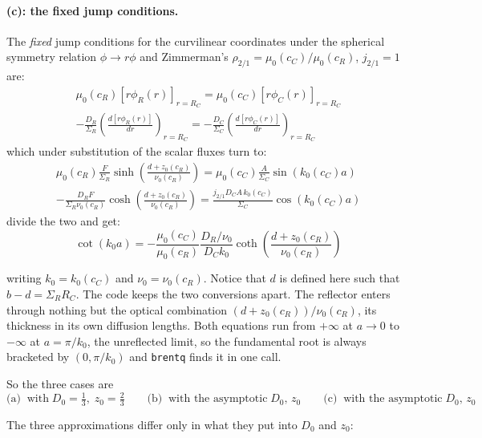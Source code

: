 \documentclass[11pt]{article}
\begin{document}
\paragraph{(c): the fixed jump conditions.} The \textit{fixed} jump conditions for the curvilinear coordinates under the spherical symmetry relation $\phi \to r\phi$ and Zimmerman's $\rho_{2/1} = \mu_0(c_C)/\mu_0(c_R)$, $j_{2/1} = 1$ are:
\begin{gather}
    \mu_0(c_R)\left[r \phi_R(r)\right]_{r=R_C} = \mu_0(c_C) \left[r\phi_C(r)\right]_{r=R_C} \\
    -\frac{D_R}{\Sigma_R}\left(\frac{d[r\phi_R(r)]}{dr}\right)_{r=R_C} = -\frac{D_C}{\Sigma_C}\left(\frac{d[r\phi_C(r)]}{dr}\right)_{r=R_C}
\end{gather}
which under substitution of the scalar fluxes turn to:
\begin{gather}
    \mu_0(c_R)\frac{F}{\Sigma_{R}}\sinh\!\left(\frac{d + z_0(c_R)}{\nu_0(c_R)}\right) = \mu_0(c_C) \frac{A}{\Sigma_{C}}\sin\!\left(k_0(c_C)a\right) \\
    -\frac{D_R F}{\Sigma_R\nu_0(c_R)}\cosh\!\left(\frac{d + z_0(c_R)}{\nu_0(c_R)}\right) = \frac{j_{2/1} D_C A\,k_0(c_C)}{\Sigma_C} \cos\!\left(k_0(c_C)a\right)
\end{gather} 
divide the two and get:
\begin{equation}
    \boxed{\;\cot\!(k_0a) = -\frac{\mu_0(c_C)}{\mu_0(c_R)}\frac{D_R/\nu_0}{D_C k_0}\coth\!\left(\frac{d + z_0(c_R)}{\nu_0(c_R)}\right)\;}
    \label{eq:reflfixed}
\end{equation}

writing $k_0 = k_0(c_C)$ and $\nu_0 = \nu_0(c_R)$. Notice that $d$ is defined here such that $b - d = \Sigma_{R}R_C$. The code keeps the two conversions apart. The reflector enters through nothing but the optical combination $\left(d + z_0(c_R)\right)/\nu_0(c_R)$, its thickness in its own diffusion lengths. Both equations run from $+\infty$ at $a \to 0$ to $-\infty$ at $a = \pi/k_0$, the unreflected limit, so the fundamental root is always bracketed by $(0,\pi/k_0)$ and \texttt{brentq} finds it in one call.

So the three cases are
\begin{equation*}
    \text{(a)}\;\;\text{with}\;D_0 = \tfrac13,\;z_0 = \tfrac23
    \qquad
    \text{(b)}\;\;\text{with the asymptotic}\;D_0,\,z_0
    \qquad
    \text{(c)}\;\;\text{with the asymptotic}\;D_0,\,z_0
\end{equation*}

The three approximations differ only in what they put into $D_0$ and $z_0$:
\end{document}
